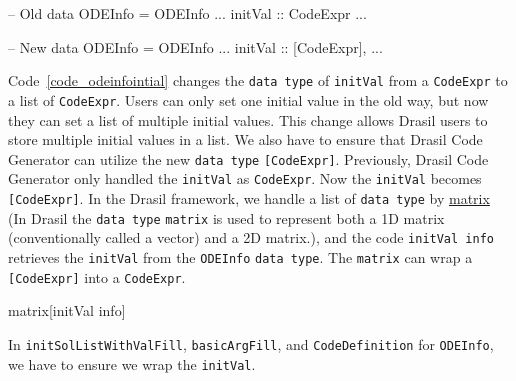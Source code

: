 \begin{listing}[ht]
\begin{haskell1}
-- Old 
data ODEInfo = ODEInfo {
  ...
  initVal :: CodeExpr
  ...
}

-- New 
data ODEInfo = ODEInfo {
  ...
  initVal :: [CodeExpr],
  ...
}
\end{haskell1}
\label{code_odeinfointial}
\end{listing}
Code~\ref{code_odeinfointial} changes the \verb|data type| of \verb|initVal| from a \verb|CodeExpr| to a list of \verb|CodeExpr|. Users can only set one initial value in the old way, but now they can set a list of multiple initial values. This change allows Drasil users to store multiple initial values in a list. We also have to ensure that Drasil Code Generator can utilize the new \verb|data type| \verb|[CodeExpr]|. Previously, Drasil Code Generator only handled the \verb|initVal| as \verb|CodeExpr|. Now the \verb|initVal| becomes \verb|[CodeExpr]|. In the Drasil framework, we handle a list of \verb|data type| by \href{https://jacquescarette.github.io/Drasil/docs/drasil-code-base-0.1.9.0/Language-Drasil-CodeExpr.html#v:matrix}{matrix} (In Drasil the \verb|data type| \verb|matrix| is used to represent both a 1D matrix (conventionally called a vector) and a 2D matrix.), and the code \verb|initVal info| retrieves the \verb|initVal| from the \verb|ODEInfo| \verb|data type|. The \verb|matrix| can wrap a \verb|[CodeExpr]| into a \verb|CodeExpr|. 

\begin{listing}[ht]
\begin{haskell1}
matrix[initVal info]
\end{haskell1}
\end{listing}

In \verb|initSolListWithValFill|, \verb|basicArgFill|, and \verb|CodeDefinition| for \verb|ODEInfo|, we have to ensure we wrap the \verb|initVal|.



